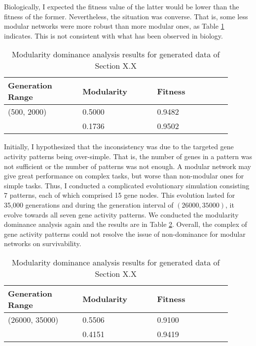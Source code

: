 Biologically, I expected the fitness value of the latter would be lower than the fitness of the former. Nevertheless, the situation was converse. That is, some less modular networks were more robust than more modular ones, as Table \ref{table:2000notmodularity} indicates. This is not consistent with what has been observed in biology.
\begin{table}[h]
	\centering
	\caption{Modularity dominance analysis results for generated data of Section X.X}
	\label{table:2000notmodularity}
	\begin{tabular}{| p{0.3\linewidth}  | p{0.3\linewidth}  | p{0.3\linewidth} |} 
		\hline
		Generation Range & Modularity & Fitness \\
		\hline
		(500, 2000) & 0.5000 & 0.9482 \\ 
		\hline
		 & 0.1736 & 0.9502 \\
		\hline
	\end{tabular}
\end{table}
Initially, I hypothesized that the inconsistency was due to the targeted gene activity patterns being over-simple. That is, the number of genes in a pattern was not sufficient or the number of patterns was not enough. A modular network may give great performance on complex tasks, but worse than non-modular ones for simple tasks. Thus, I conducted a complicated evolutionary simulation consisting $7$ patterns, each of which comprised 15 gene nodes. This evolution lasted for 35,000 generations and during the generation interval of $(26000, 35000)$, it evolve towards all seven gene activity patterns. We conducted the modularity dominance analysis again and the results are in Table \ref{table:35000notmodularity}. Overall, the complex of gene activity patterns could not resolve the issue of non-dominance for modular networks on survivability. 
\begin{table}[h]
	\centering
	\caption{Modularity dominance analysis results for generated data of Section X.X}
	\label{table:35000notmodularity}
	\begin{tabular}{| p{0.3\linewidth}  | p{0.3\linewidth}  | p{0.3\linewidth} |} 
		\hline
		Generation Range & Modularity & Fitness \\
		\hline
		(26000, 35000) & 0.5506 & 0.9100 \\ 
		\hline
		& 0.4151 & 0.9419 \\
		\hline
	\end{tabular}
\end{table}
